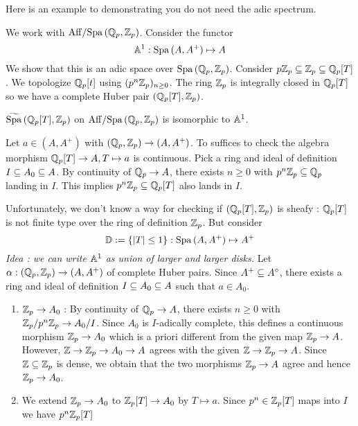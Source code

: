 \documentclass{article}
\begin{document}
Here is an example to demonstrating you do not need the adic spectrum.
\begin{eg}
  We work with $\mathrm{Aff} / \mathrm{Spa}\,(\mathbb{Q}_p , \mathbb{Z}_p)$.
  Consider the functor \[
    \mathbb{A}^1 : \mathrm{Spa}\,(A , A^+) \mapsto A
  \]
  We show that this is an adic space over $\mathrm{Spa}\,(\mathbb{Q}_p , \mathbb{Z}_p)$.
  Consider $p \mathbb{Z}_p \subseteq \mathbb{Z}_p \subseteq \mathbb{Q}_p[T]$.
  We topologize $\mathbb{Q}_p[t]$ using $(p^n \mathbb{Z}_p)_{n \geq 0}$.
  The ring $\mathbb{Z}_p$ is integrally closed in $\mathbb{Q}_p[T]$ 
  so we have a complete Huber pair $(\mathbb{Q}_p[T] , \mathbb{Z}_p)$.
  \begin{lem}
    
    $\widetilde{\mathrm{Spa}\,}(\mathbb{Q}_p[T] , \mathbb{Z}_p)$ on $\mathrm{Aff} / \mathrm{Spa}\,(\mathbb{Q}_p , \mathbb{Z}_p)$
    is isomorphic to $\mathbb{A}^1$.
    \begin{proof1}
      Let $a \in (A , A^+)$ with $(\mathbb{Q}_p , \mathbb{Z}_p) \to (A , A^+)$.
      To suffices to check the algebra morphism $\mathbb{Q}_p[T] \to A , T \mapsto a$
      is continuous.
      Pick a ring and ideal of definition $I \subseteq A_0 \subseteq A$.
      By continuity of $\mathbb{Q}_p \to A$,
      there exists $n \geq 0$ with $p^n \mathbb{Z}_p \subseteq \mathbb{Q}_p$ landing in $I$.
      This implies $p^n \mathbb{Z}_p \subseteq \mathbb{Q}_p[T]$ also lands in $I$.
    \end{proof1}
  \end{lem}
  Unfortunately, we don't know a way for checking if 
  $(\mathbb{Q}_p[T] , \mathbb{Z}_p)$ is sheafy : 
  $\mathbb{Q}_p[T]$ is not finite type over the ring of definition $\mathbb{Z}_p$.
  But consider \[
    \mathbb{D} := \left\{\left\vert T \right\vert \leq 1\right\} : \mathrm{Spa}\,(A , A^+) \mapsto A^+
  \]
  \emph{Idea : we can write $\mathbb{A}^1$ as union of larger and larger disks.}
  Let $\alpha : (\mathbb{Q}_p , \mathbb{Z}_p) \to (A , A^+)$ of complete Huber pairs.
  Since $A^+ \subseteq A^\circ$,
  there exists a ring and ideal of definition $I \subseteq A_0 \subseteq A$
  such that $a \in A_0$.
  \begin{enumerate}
    \item $\mathbb{Z}_p \to A_0$ : 
    By continuity of $\mathbb{Q}_p \to A$,
    there exists $n \geq 0$ with $\mathbb{Z}_p / p^n \mathbb{Z}_p \to A_0 / I$.
    Since $A_0$ is $I$-adically complete,
    this defines a continuous morphism $\mathbb{Z}_p \to A_0$
    which is a priori different from the given map $\mathbb{Z}_p \to A$.
    However, $\mathbb{Z} \to \mathbb{Z}_p \to A_0 \to A$ agrees with
    the given $\mathbb{Z} \to \mathbb{Z}_p \to A$.
    Since $\mathbb{Z} \subseteq \mathbb{Z}_p$ is dense, we obtain that 
    the two morphisms $\mathbb{Z}_p \to A$ agree and hence $\mathbb{Z}_p \to A_0$.
    \item We extend $\mathbb{Z}_p \to A_0$ to $\mathbb{Z}_p[T] \to A_0$ by $T \mapsto a$.
    Since $p^n \in \mathbb{Z}_p[T]$ maps into $I$ we have $p^n \mathbb{Z}_p[T]$

\end{enumerate}
\end{eg}
\end{document}
